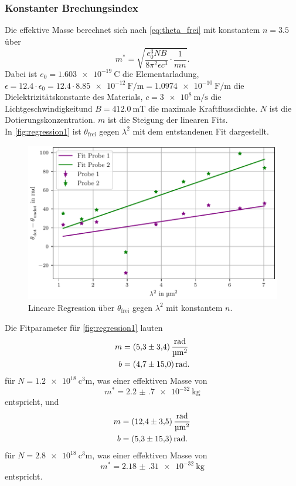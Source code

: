\subsubsection{Konstanter Brechungsindex}
Die effektive Masse berechnet sich nach \autoref{eq:theta_frei} mit konstantem $n = \num{3,5}$ über
\begin{equation}
    m^* = \sqrt{\frac{e_0^3 N B}{8 \pi^2 \epsilon c^3} \cdot \frac{1}{mn}}.
\label{eq:masse}
\end{equation}
Dabei ist $e_0 = \qty{1.603e-19}{\coulomb}$ die Elementarladung, $\epsilon = \num{12.4} \cdot \epsilon_0 = \num{12.4} \cdot \qty{8.85e-12}{\farad\per\meter} = \qty{1.0974e-10}{\farad\per\meter}$ die Dielektrizitätskonstante des Materials,
$c= \qty{3e8}{\meter\per\second}$ die Lichtgeschwindigkeitund $B= \qty{412.0}{\milli\tesla}$ die maximale Kraftflussdichte. $N$ ist die Dotierungskonzentration. $m$ ist die Steigung der linearen Fits.\\
In \autoref{fig:regression1} ist $\theta_\text{frei}$ gegen $\lambda^2$ mit dem entstandenen Fit dargestellt.
\begin{figure}
    \centering
    \includegraphics[width=\textwidth]{plots/fits_ohne_n.pdf}
    \caption{Lineare Regression über $\theta_\text{frei}$ gegen $\lambda^2$ mit konstantem $n$.}
    \label{fig:regression1}
\end{figure}
Die Fitparameter für \autoref{fig:regression1} lauten
\begin{align*}
    m &= \qty{5.3(3.4)}{\radian\per\square\micro\meter} \\
    b &= \qty{4.7+-15.0}{\radian}.
\end{align*}
für $N = \qty{1.2e18}{\cubic\centi\meter}$, was einer effektiven Masse von
\begin{equation*}
    m^* = \qty{2.2(7)e-32}{\kilo\gram}
\end{equation*}
entspricht, und
\begin{align*}
    m &= \qty{12.4(3.5)}{\radian\per\square\micro\meter} \\
    b &= \qty{5.3+-15.3}{\radian}.
\end{align*}
für $N = \qty{2.8e18}{\cubic\centi\meter}$, was einer effektiven Masse von
\begin{equation*}
    m^* = \qty{2.18(31)e-32}{\kilo\gram}
\end{equation*} 
entspricht.


